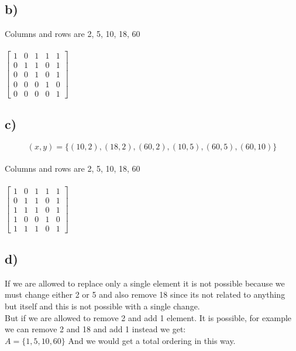 \documentclass[12pt]{article}
\begin{document}
\subsection*{b) }
Columns and rows are 2, 5, 10, 18, 60\\\\
$\begin{bmatrix}
1 & 0 & 1 & 1 & 1\\
0 & 1 & 1 & 0 & 1\\
0 & 0 & 1 & 0 & 1\\
0 & 0 & 0 & 1 & 0\\
0 & 0 & 0 & 0 & 1 
\end{bmatrix}$

\subsection*{c) }

$$(x,y)= \{ (10,2),(18,2), (60,2), (10,5), (60,5) , (60,10)\}$$\\
Columns and rows are 2, 5, 10, 18, 60\\\\
$\begin{bmatrix}
1 & 0 & 1 & 1 & 1\\
0 & 1 & 1 & 0 & 1\\
1 & 1 & 1 & 0 & 1\\
1 & 0 & 0 & 1 & 0\\
1 & 1 & 1 & 0 & 1
\end{bmatrix}$

\subsection*{d) }
If we are allowed to replace only a single element it is not possible because we must change either 2 or 5 and also remove 18 since its not related to anything but itself and this is not possible with a single change.\\
But if we are allowed to remove 2 and add 1 element. It is possible, for example we can remove 2 and 18 and add 1 instead we get:\\
$A= \{1,5,10,60\}$
And we would get a total ordering in this way.
 
\end{document}
